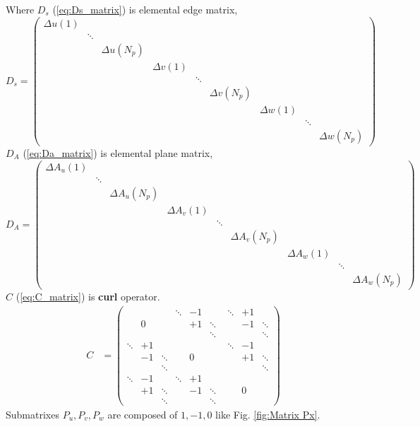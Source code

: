 Where $D_{s}$ (\ref{eq:Ds_matrix}) is elemental edge matrix,
\begin{equation}
D_{s}=
	\begin{pmatrix}
	\Delta u(1)&&&&&&&&\\
	&\ddots &&&&&&&\\
	&&\Delta u(N_{p})&&&&&&\\
	&&&\Delta v(1)&&&&&\\
	&&&&\ddots &&&&\\
	&&&&&\Delta v(N_{p})&&&\\
	&&&&&&\Delta w(1)&&\\
	&&&&&&&\ddots &\\
	&&&&&&&&\Delta w(N_{p})
	\end{pmatrix}
	\label{eq:Ds_matrix}
\end{equation}
$D_{A}$ (\ref{eq:Da_matrix}) is elemental plane matrix,
\begin{equation}
D_{A}=
	\begin{pmatrix}
	\Delta A_{u}(1)&&&&&&&&\\
	&\ddots &&&&&&&\\
	&&\Delta A_{u}(N_{p})&&&&&&\\
	&&&\Delta A_{v}(1)&&&&&\\
	&&&&\ddots &&&&\\
	&&&&&\Delta A_{v}(N_{p})&&&\\
	&&&&&&\Delta A_{w}(1)&&\\
	&&&&&&&\ddots &\\
	&&&&&&&&\Delta A_{w}(N_{p})
	\end{pmatrix}
	\label{eq:Da_matrix}
\end{equation}
$C$ (\ref{eq:C_matrix}) is \textbf{curl} operator.
\begin{align}
C&=\left(
	\begin{array}{ccc|ccc|ccc}
	&&&\ddots &-1& &\ddots &+1&\\	
	&0&&&+1&\ddots&&-1&\ddots\\
	&&&&&\ddots&&&\ddots\\	
	\hline
	\ddots &+1&&&&&\ddots &-1&\\
	&-1 &\ddots&&0&\quad&&+1&\ddots\\
	&&\ddots&&&&&&\ddots\\
	\hline
	\ddots &-1&&\ddots &+1&&&&\\
	&+1 &\ddots&&-1&\ddots&&0&\\
	&&\ddots&&&\ddots&&&
	\end{array}\right)
\label{eq:C_matrix}
\end{align}
Submatrixes $P_{u},P_{v},P_{w}$ are composed of $1,-1,0$ like Fig. \ref{fig:Matrix Px}.\\
 
